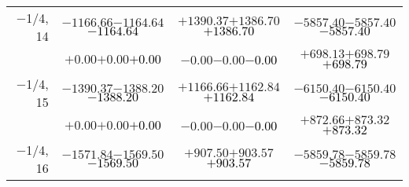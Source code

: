 \documentclass[compress]{beamer}
\begin{document}
\begin{frame}
{\begin{tabular}{r | c | c | c}
$-$1/4, 14 & $-1166.66$\hspace{0.1 cm}$-1164.64$\hspace{0.1 cm}\textcolor{black}{$-1164.64$} & $+1390.37$\hspace{0.1 cm}$+1386.70$\hspace{0.1 cm}\textcolor{black}{$+1386.70$} & $-5857.40$\hspace{0.1 cm}$-5857.40$\hspace{0.1 cm}\textcolor{black}{$-5857.40$} \\
           & $+0.00$\hspace{0.1 cm}$+0.00$\hspace{0.1 cm}\textcolor{black}{$+0.00$} & $-0.00$\hspace{0.1 cm}$-0.00$\hspace{0.1 cm}\textcolor{black}{$-0.00$} & $+698.13$\hspace{0.1 cm}$+698.79$\hspace{0.1 cm}\textcolor{black}{$+698.79$} \\
$-$1/4, 15 & $-1390.37$\hspace{0.1 cm}$-1388.20$\hspace{0.1 cm}\textcolor{black}{$-1388.20$} & $+1166.66$\hspace{0.1 cm}$+1162.84$\hspace{0.1 cm}\textcolor{black}{$+1162.84$} & $-6150.40$\hspace{0.1 cm}$-6150.40$\hspace{0.1 cm}\textcolor{black}{$-6150.40$} \\
           & $+0.00$\hspace{0.1 cm}$+0.00$\hspace{0.1 cm}\textcolor{black}{$+0.00$} & $-0.00$\hspace{0.1 cm}$-0.00$\hspace{0.1 cm}\textcolor{black}{$-0.00$} & $+872.66$\hspace{0.1 cm}$+873.32$\hspace{0.1 cm}\textcolor{black}{$+873.32$} \\
$-$1/4, 16 & $-1571.84$\hspace{0.1 cm}$-1569.50$\hspace{0.1 cm}\textcolor{black}{$-1569.50$} & $+907.50$\hspace{0.1 cm}$+903.57$\hspace{0.1 cm}\textcolor{black}{$+903.57$} & $-5859.78$\hspace{0.1 cm}$-5859.78$\hspace{0.1 cm}\textcolor{black}{$-5859.78$} \\

\end{tabular}}
\end{frame}
\end{document}
